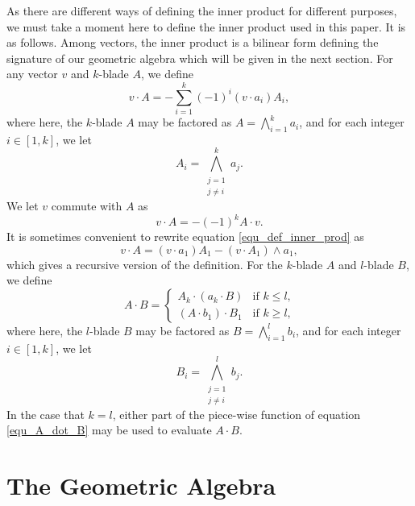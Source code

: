 \documentclass{ecgd-l}
\theoremstyle{definition}
\theoremstyle{remark}
\numberwithin{equation}{section}
\begin{document}
As there are different ways of defining the inner product for different purposes, we must
take a moment here to define the inner product used in this paper.  It is as follows.
Among vectors, the inner product is a bilinear form defining the signature of our geometric algebra
which will be given in the next section.  For any vector $v$ and $k$-blade $A$, we define
\begin{equation}\label{equ_def_inner_prod}
v\cdot A = -\sum_{i=1}^k(-1)^i(v\cdot a_i)A_i,
\end{equation}
where here, the $k$-blade $A$ may be factored as $A=\bigwedge_{i=1}^k a_i$,
and for each integer $i\in[1,k]$, we let
\begin{equation*}
A_i=\bigwedge_{\substack{j=1\\j\neq i}}^k a_j.
\end{equation*}
We let $v$ commute with $A$ as
\begin{equation*}
v\cdot A=-(-1)^kA\cdot v.
\end{equation*}
It is sometimes convenient to rewrite equation \eqref{equ_def_inner_prod} as
\begin{equation*}
v\cdot A = (v\cdot a_1)A_1 - (v\cdot A_1)\wedge a_1,
\end{equation*}
which gives a recursive version of the definition.  For the $k$-blade $A$ and
$l$-blade $B$, we define
\begin{equation}\label{equ_A_dot_B}
A\cdot B = \left\{\begin{array}{ll}
A_k\cdot (a_k\cdot B) & \mbox{if $k\leq l$,} \\
(A\cdot b_1)\cdot B_1 & \mbox{if $k\geq l$,}
\end{array}\right.
\end{equation}
where here, the $l$-blade $B$ may be factored as $B=\bigwedge_{i=1}^l b_i$, and for each
integer $i\in[1,k]$, we let
\begin{equation*}
B_i=\bigwedge_{\substack{j=1\\j\neq i}}^l b_j.
\end{equation*}
In the case that $k=l$, either part of the piece-wise function of equation \eqref{equ_A_dot_B} may be used to
evaluate $A\cdot B$.

\section{The Geometric Algebra}
\end{document}
